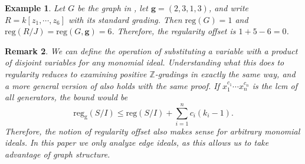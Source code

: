 \documentclass[dvipsnames,10pt]{article}
\newtheorem{theorem}{Theorem}[section]
\newtheorem{defi}[theorem]{Definition}
\newtheorem{example}[theorem]{Example}
\newtheorem{remark}[theorem]{Remark}
\begin{document}




\begin{example}
Let $G$ be the graph in , let $\mathbf{g}=(2,3,1,3)$, and write $R=k[z_1,\cdots,z_6]$ with its standard grading. Then $\mathrm{reg}(G)=1$ and $\mathrm{reg}(R/J)=\mathrm{reg}(G,\mathbf{g})=6$. Therefore, the regularity offset is $1+5-6=0$.
\end{example}

\begin{remark}
We can define the operation of substituting a variable with a product of disjoint variables for any monomial ideal. Understanding what this does to regularity reduces to examining positive $\mathbb{Z}$-gradings in exactly the same way, and a more general version of  also holds with the same proof. If $x_1^{c_1}\cdots x_n^{c_n}$ is the lcm of all generators, the bound would be
\begin{equation*}
    \mathrm{reg}_{\mathrm{g}}(S/I) \leqslant \mathrm{reg}(S/I) + \sum_{i=1}^n c_i(k_i-1).
\end{equation*}
Therefore, the notion of regularity offset also makes sense for arbitrary monomial ideals. In this paper we only analyze edge ideals, as this allows us to take advantage of graph structure.
\end{remark}
\end{document}
